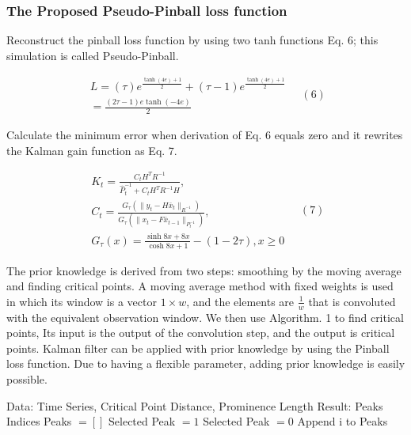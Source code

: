 \documentclass[12pt,a4paper]{article}
\begin{document}
	\subsubsection{The Proposed Pseudo-Pinball loss function}
	
	Reconstruct the pinball loss function by using two tanh functions Eq. 6; this simulation is called Pseudo-Pinball.
	
	\begin{equation}
		\begin{array}{l}{L = (\tau)e^{\frac{\tanh(4e) + 1}{2}} + (\tau -1)e^{\frac{\tanh(4e) + 1}{2}}}\\
			{= \frac{(2\tau - 1)e\tanh(-4e)}{2}} 
		\end{array} \quad (6)
	\end{equation}
	
	Calculate the minimum error when derivation of Eq. 6 equals zero and it rewrites the Kalman gain function as Eq. 7.
	
	\begin{equation}
		\begin{array}{l}{K_{t} = \frac{C_{t}H^{T}R^{-1}}{\hat{P}_{t}^{-1} + C_{t}H^{T}R^{-1}H},}\\
			{C_{t} = \frac{G_{\tau}(\|y_{t} - H\bar{x}_{t}\|_{R^{-1}})}{G_{\tau}(\|x_{t} - F\bar{x}_{t - 1}\|_{P_{t}^{-1}})},}\\
			{G_{\tau}(x) = \frac{\sinh 8x + 8x}{\cosh 8x + 1} -(1 - 2\tau),x\geq 0} 
		\end{array} \quad (7)
	\end{equation}
	
	The prior knowledge is derived from two steps: smoothing by the moving average and finding critical points. A moving average method with fixed weights is used in which its window is a vector \(1 \times w\), and the elements are \(\frac{1}{w}\) that is convoluted with the equivalent observation window. We then use Algorithm. 1 to find critical points, Its input is the output of the convolution step, and the output is critical points. Kalman filter can be applied with prior knowledge by using the Pinball loss function. Due to having a flexible parameter, adding prior knowledge is easily possible.
	
	\begin{algorithm}
		\caption{Find Peaks}
		\begin{algorithmic}[1]
			\STATE Data: Time Series, Critical Point Distance, Prominence Length
			\STATE Result: Peaks Indices
			\STATE Peaks \(= []\)
			\STATE Selected Peak \(= 1\)
			\STATE Selected Peak \(= 0\)
			\ENDIF
			\ENDFOR
			\STATE Append i to Peaks
			\ENDIF
			\ENDIF
			\ENDFOR
		\end{algorithmic}
	\end{algorithm}
	
\end{document}
